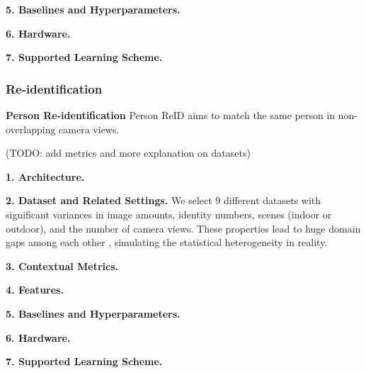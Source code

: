 \textbf{5. Baselines and Hyperparameters.}

\textbf{6. Hardware.}

\textbf{7. Supported Learning Scheme.}








\subsubsection{Re-identification}
\textbf{Person Re-identification} Person ReID aims to match the same person in non-overlapping camera views. 

(TODO: add metrics and more explanation on datasets)

\textbf{1. Architecture.}

\textbf{2. Dataset and Related Settings.}
We select 9 different datasets with significant variances in image amounts, identity numbers, scenes (indoor or outdoor), and the number of camera views. These properties lead to huge domain gaps among each other , simulating the statistical heterogeneity in reality. 

\textbf{3. Contextual Metrics.}

\textbf{4. Features.}

\textbf{5. Baselines and Hyperparameters.}

\textbf{6. Hardware.}

\textbf{7. Supported Learning Scheme.}